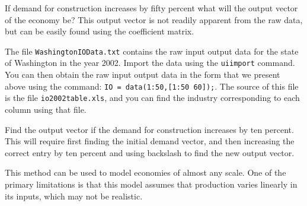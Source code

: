 \begin{problem}
If demand for construction increases by fifty percent what will the output vector of the economy be? This output vector is not readily apparent from the raw data, but can be easily found using the coefficient matrix.
\end{problem}

\begin{problem}
The file {\tt WashingtonIOData.txt} contains the raw input output data for the state of Washington in the year 2002. Import the data using the {\tt uiimport} command. You can then obtain the raw input output data in the form that we present above using the command: {\tt IO = data(1:50,[1:50 60]);}. The source of this file is the file {\tt io2002table.xls}, and you can find the industry corresponding to each column using that file.

Find the output vector if the demand for construction increases by ten percent. This will require first finding the initial demand vector, and then increasing the correct entry by ten percent and using backslash to find the new output vector.
\end{problem}

This method can be used to model economies of almost any scale. One of the primary limitations is that this model assumes that production varies linearly in its inputs, which may not be realistic.


